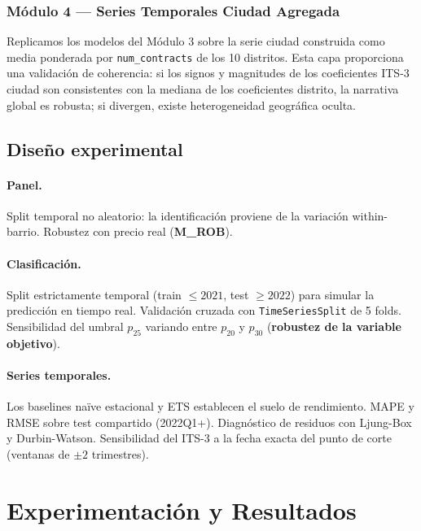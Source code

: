 \documentclass[12pt,a4paper]{article}
\begin{document}
\subsubsection{Módulo 4 --- Series Temporales Ciudad Agregada}

Replicamos los modelos del Módulo 3 sobre la serie ciudad construida como media
ponderada por \texttt{num\_contracts} de los 10 distritos. Esta capa proporciona una
validación de coherencia: si los signos y magnitudes de los coeficientes ITS-3 ciudad
son consistentes con la mediana de los coeficientes distrito, la narrativa global es
robusta; si divergen, existe heterogeneidad geográfica oculta.

\subsection{Diseño experimental}

\paragraph{Panel.} Split temporal no aleatorio: la identificación proviene de la
variación within-barrio. Robustez con precio real (\textbf{M\_ROB}).

\paragraph{Clasificación.} Split estrictamente temporal (train $\leq 2021$, test
$\geq 2022$) para simular la predicción en tiempo real. Validación cruzada con
\texttt{TimeSeriesSplit} de 5 folds. Sensibilidad del umbral $p_{25}$ variando entre
$p_{20}$ y $p_{30}$ (\textbf{robustez de la variable objetivo}).

\paragraph{Series temporales.} Los baselines naïve estacional y ETS establecen el
suelo de rendimiento. MAPE y RMSE sobre test compartido (2022Q1+). Diagnóstico de
residuos con Ljung-Box y Durbin-Watson. Sensibilidad del ITS-3 a la fecha exacta
del punto de corte (ventanas de $\pm 2$ trimestres).

\section{Experimentación y Resultados}
\label{sec:resultados}
\end{document}
